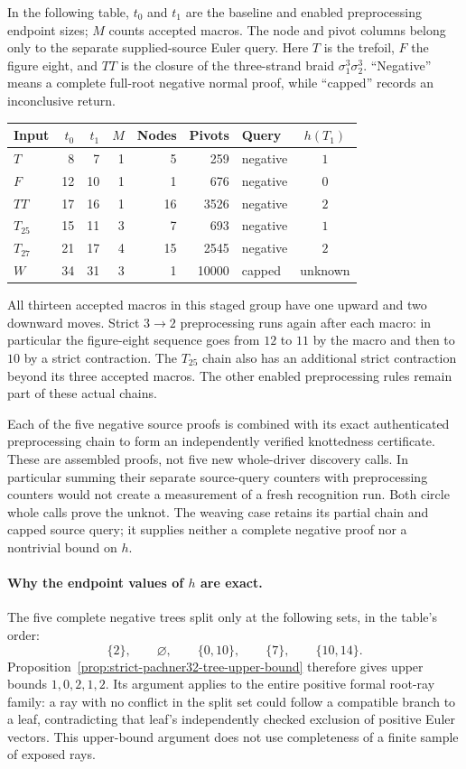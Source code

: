 In the following table, $t_0$ and $t_1$ are the baseline and enabled
preprocessing endpoint sizes; $M$ counts accepted macros.  The node and
pivot columns belong only to the separate supplied-source Euler query.
Here $T$ is the trefoil, $F$ the figure eight, and $TT$ is the closure
of the three-strand braid $\sigma_1^3\sigma_2^3$.  ``Negative'' means
a complete full-root negative normal proof, while ``capped'' records
an inconclusive return.
\begin{center}
\begin{tabular}{lrrrrrlc}
\hline
Input & $t_0$ & $t_1$ & $M$ & Nodes & Pivots & Query & $h(T_1)$\\
\hline
$T$      & 8  & 7  & 1 & 5  & 259   & negative & $1$\\
$F$      & 12 & 10 & 1 & 1  & 676   & negative & $0$\\
$TT$     & 17 & 16 & 1 & 16 & 3526  & negative & $2$\\
$T_{25}$ & 15 & 11 & 3 & 7  & 693   & negative & $1$\\
$T_{27}$ & 21 & 17 & 4 & 15 & 2545  & negative & $2$\\
$W$      & 34 & 31 & 3 & 1  & 10000 & capped   & unknown\\
\hline
\end{tabular}
\end{center}
All thirteen accepted macros in this staged group have one upward and
two downward moves.  Strict $3\to2$ preprocessing runs again after
each macro: in particular the figure-eight sequence goes from $12$ to
$11$ by the macro and then to $10$ by a strict contraction.  The
$T_{25}$ chain also has an additional strict contraction beyond its
three accepted macros.  The other enabled preprocessing rules remain
part of these actual chains.

Each of the five negative source proofs is combined with its exact
authenticated preprocessing chain to form an independently verified
knottedness certificate.  These are assembled proofs, not five new
whole-driver discovery calls.  In particular summing their separate
source-query counters with preprocessing counters would not create a
measurement of a fresh recognition run.  Both circle whole calls prove
the unknot.  The weaving case retains its partial chain and capped
source query; it supplies neither a complete negative proof nor a
nontrivial bound on $h$.

\paragraph{Why the endpoint values of $h$ are exact.}
The five complete negative trees split only at the following sets,
in the table's order:
\[
        \{2\},\qquad\varnothing,\qquad\{0,10\},\qquad
        \{7\},\qquad\{10,14\}.
\]
Proposition~\ref{prop:strict-pachner32-tree-upper-bound} therefore
gives upper bounds $1,0,2,1,2$.  Its argument applies to the entire
positive formal root-ray family: a ray with no conflict in the split
set could follow a compatible branch to a leaf, contradicting that
leaf's independently checked exclusion of positive Euler vectors.
This upper-bound argument does not use completeness of a finite
sample of exposed rays.

